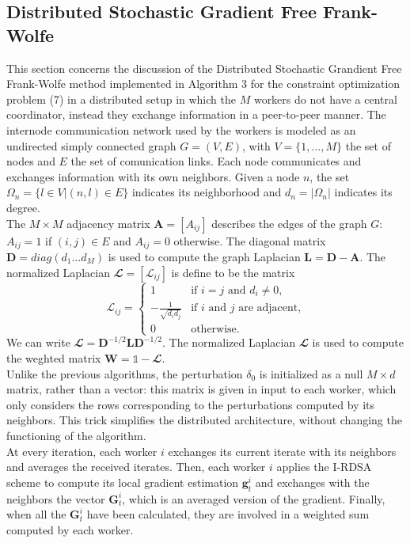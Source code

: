\subsection{Distributed Stochastic Gradient Free Frank-Wolfe}
This section concerns the discussion of the Distributed Stochastic Grandient Free Frank-Wolfe method implemented in Algorithm 3 for the constraint optimization problem (7) in a distributed setup in which the $M$ workers do not have a central coordinator, instead they exchange information in a peer-to-peer manner. The internode communication network used by the workers is modeled as an undirected simply connected graph $G=(V,E)$, with $V=\{1, \dots, M\}$ the set of nodes and $E$ the set of comunication links. Each node communicates and exchanges information with its own neighbors. Given a node $n$, the set $\Omega_n = \{l \in V | (n,l)\in E\}$ indicates its neighborhood and $d_n = |\Omega_n|$ indicates its degree.\\ The $M \times M$ adjacency matrix $\mathbf{A}=[A_{ij}]$ describes the edges of the graph $G$: $A_{ij}=1$ if $(i,j) \in E$ and $A_{ij}=0$ otherwise. The diagonal matrix $\mathbf{D}=diag(d_1 \dots d_M)$ is used to compute the graph Laplacian $\mathbf{L}=\mathbf{D}-\mathbf{A}$. The normalized Laplacian $\mathbfcal{L} = [\mathcal{L}_{ij}]$ is define to be the matrix
\[
\mathcal{L}_{ij}=
\begin{cases}
	1 & \text{if $i=j$ and }d_i\ne0, \\
	-\frac{1}{\sqrt{d_id_j}} & \text{if $i$ and $j$ are adjacent,}\\
	0 & \text{otherwise.}
	
\end{cases}
\]
We can write $\mathbfcal{L} = \mathbf{D}^{-1/2}\mathbf{L}\mathbf{D}^{-1/2}$. The normalized Laplacian $\mathbfcal{L}$ is used to compute the weghted matrix $\mathbf{W} = \mathbb{1}- \mathbfcal{L}$.\\
Unlike the previous algorithms, the perturbation \mbox{\boldmath$ \delta$}$_0$ is initialized as a null $M \times d$ matrix, rather than a vector: this matrix is given in input to each worker, which only considers the rows corresponding to the perturbations computed by its neighbors. This trick simplifies the distributed architecture, without changing the functioning of the algorithm.\\
At every iteration, each worker $i$ exchanges its current iterate with its neighbors and averages the received iterates. Then, each worker $i$ applies the I-RDSA scheme to compute its local gradient estimation $\mathbf{g}_t^i$ and exchanges with the neighbors the vector $\mathbf{G}_t^i$, which is an averaged version of the gradient. Finally, when all the $\mathbf{G}_t^i$ have been calculated, they are involved in a weighted sum computed by each worker.\\
